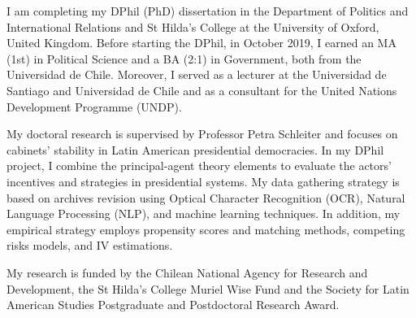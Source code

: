 




\vspace{3mm}

\begin{cvparagraph}

I am completing my DPhil (PhD) dissertation in the Department of Politics and International Relations and St Hilda’s College at the University of Oxford, United Kingdom. Before starting the DPhil, in October 2019, I earned an MA (1st) in Political Science and a BA (2:1) in Government, both from the Universidad de Chile. Moreover, I served as a lecturer at the Universidad de Santiago and Universidad de Chile and as a consultant for the United Nations Development Programme (UNDP).

My doctoral research is supervised by Professor Petra Schleiter and focuses on cabinets’ stability in Latin American presidential democracies. In my DPhil project, I combine the principal-agent theory elements to evaluate the actors’ incentives and strategies in presidential systems. My data gathering strategy is based on archives revision using Optical Character Recognition (OCR), Natural Language Processing (NLP), and machine learning techniques. In addition, my empirical strategy employs propensity scores and matching methods, competing risks models, and IV estimations. 

My research is funded by the Chilean National Agency for Research and Development, the St Hilda’s College Muriel Wise Fund and the Society for Latin American Studies Postgraduate and Postdoctoral Research Award.
\vspace{1mm}
\end{cvparagraph}
